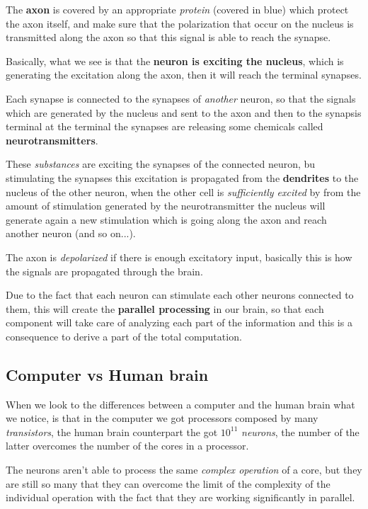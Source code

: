 \documentclass{article}
\begin{document}
The \textbf{axon} is covered by an appropriate \textit{protein} (covered in blue) which protect the axon itself,
and make sure that the polarization that occur on the nucleus is transmitted along the axon so that this signal is able
to reach the synapse.

Basically, what we see is that the \textbf{neuron is exciting the nucleus}, which is generating the excitation along the axon,
then it will reach the terminal synapses.

Each synapse is connected to the synapses of \textit{another} neuron, so that the signals which are generated by
the nucleus and sent to the axon and then to the synapsis terminal at the terminal the synapses
are releasing some chemicals called \textbf{neurotransmitters}.

These \textit{substances} are exciting the synapses of the connected neuron, bu stimulating the synapses this excitation is
propagated from the \textbf{dendrites} to the nucleus of the other neuron, when the other cell is \textit{sufficiently excited} by
from the amount of stimulation generated by the neurotransmitter the nucleus will generate again a new stimulation
which is going along the axon and reach another neuron (and so on...).

The axon is \textit{depolarized} if there is enough excitatory input, basically this is how the signals are propagated
through the brain.

Due to the fact that each neuron can stimulate each other neurons connected to them,
this will create the \textbf{parallel processing} in our brain, so that each component will take care
of analyzing each part of the information and this is a consequence to derive a part of the total computation.

\subsection{Computer vs Human brain}
When we look to the differences between a computer and the human brain what we notice,
is that in the computer we got processors composed by many \textit{transistors}, the human brain counterpart
the got $10^11$ \textit{neurons}, the number of the latter overcomes the number of the cores in a processor.

The neurons aren’t able to process the same \textit{complex operation} of a core, but they are still so many that they
can overcome the limit of the complexity of the individual operation with the fact that they are working significantly in
parallel.
\end{document}
